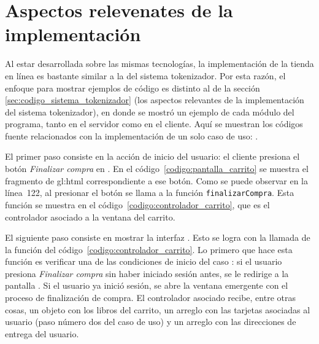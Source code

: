 %
%

\section{Aspectos relevenates de la implementación}

Al estar desarrollada sobre las mismas tecnologías, la implementación de la
tienda en línea es bastante similar a la del sistema tokenizador. Por esta
razón, el enfoque para mostrar ejemplos de código es distinto al de la sección
\ref{sec:codigo_sistema_tokenizador} (los aspectos relevantes de la
implementación del sistema tokenizador), en donde se mostró un ejemplo de cada
módulo del programa, tanto en el servidor como en el cliente. Aquí se muestran
los códigos fuente relacionados con la implementación de un solo caso de uso:
.

El primer paso consiste en la acción de inicio del usuario: el cliente presiona
el botón \textit{Finalizar compra} en .
En el código~\ref{codigo:pantalla_carrito} se muestra el fragmento de
\gls{gl:html} correspondiente a ese botón. Como se puede observar en la
línea~122, al presionar el botón se llama a la función \texttt{finalizarCompra}.
Esta función se muestra en el código~\ref{codigo:controlador_carrito}, que es
el controlador asociado a la ventana del carrito.



El siguiente paso consiste en mostrar la interfaz
. Esto se logra con la llamada
de la función del código~\ref{codigo:controlador_carrito}. Lo primero que hace
esta función es verificar una de las condiciones de inicio del caso
: si el usuario presiona
\textit{Finalizar compra} sin haber iniciado sesión antes, se le redirige a la
pantalla . Si el usuario ya inició sesión,
se abre la ventana emergente con el proceso de finalización de compra. El
controlador asociado recibe, entre otras cosas, un objeto con los libros del
carrito, un arreglo con las tarjetas asociadas al usuario (paso número dos del
caso de uso) y un arreglo con las direcciones de entrega del usuario.

